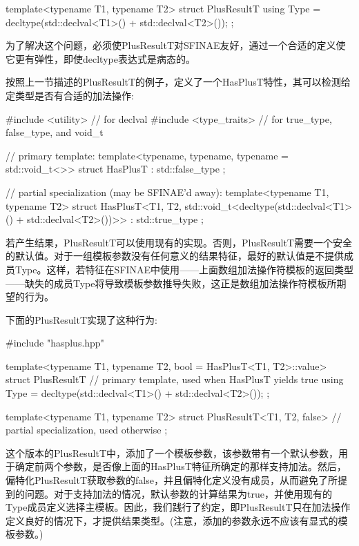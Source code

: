 \begin{cpp}
template<typename T1, typename T2>
struct PlusResultT {
	using Type = decltype(std::declval<T1>() + std::declval<T2>());
};
\end{cpp}

为了解决这个问题，必须使PlusResultT对SFINAE友好，通过一个合适的定义使它更有弹性，即使decltype表达式是病态的。

按照上一节描述的PlusResultT的例子，定义了一个HasPlusT特性，其可以检测给定类型是否有合适的加法操作:

\begin{cpp}
#include <utility> // for declval
#include <type_traits> // for true_type, false_type, and void_t

// primary template:
template<typename, typename, typename = std::void_t<>>
struct HasPlusT : std::false_type
{
};

// partial specialization (may be SFINAE’d away):
template<typename T1, typename T2>
struct HasPlusT<T1, T2, std::void_t<decltype(std::declval<T1>()
						+ std::declval<T2>())>>
: std::true_type
{
};
\end{cpp}

若产生结果，PlusResultT可以使用现有的实现。否则，PlusResultT需要一个安全的默认值。对于一组模板参数没有任何意义的结果特征，最好的默认值是不提供成员Type。这样，若特征在SFINAE中使用——上面数组加法操作符模板的返回类型——缺失的成员Type将导致模板参数推导失败，这正是数组加法操作符模板所期望的行为。

下面的PlusResultT实现了这种行为:

\begin{cpp}
#include "hasplus.hpp"

template<typename T1, typename T2, bool = HasPlusT<T1, T2>::value>
struct PlusResultT { // primary template, used when HasPlusT yields true
	using Type = decltype(std::declval<T1>() + std::declval<T2>());
};

template<typename T1, typename T2>
struct PlusResultT<T1, T2, false> { // partial specialization, used otherwise
};
\end{cpp}

这个版本的PlusResultT中，添加了一个模板参数，该参数带有一个默认参数，用于确定前两个参数，是否像上面的HasPlusT特征所确定的那样支持加法。然后，偏特化PlusResultT获取参数的false，并且偏特化定义没有成员，从而避免了所提到的问题。对于支持加法的情况，默认参数的计算结果为true，并使用现有的Type成员定义选择主模板。因此，我们践行了约定，即PlusResultT只在加法操作定义良好的情况下，才提供结果类型。(注意，添加的参数永远不应该有显式的模板参数。)

